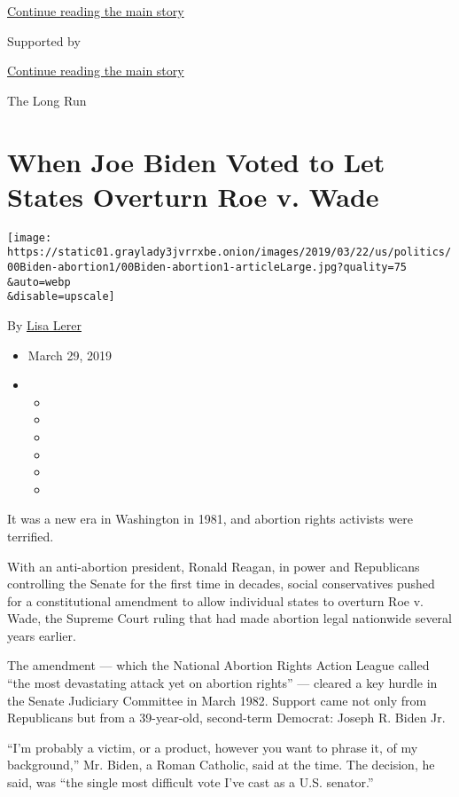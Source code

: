 \protect\hyperlink{after-top}{Continue reading the main story}

Supported by

\protect\hyperlink{after-sponsor}{Continue reading the main story}

The Long Run

\hypertarget{when-joe-biden-voted-to-let-states-overturn-roe-v-wade}{%
\section{When Joe Biden Voted to Let States Overturn Roe v.
Wade}\label{when-joe-biden-voted-to-let-states-overturn-roe-v-wade}}

\texttt{[image: https://static01.graylady3jvrrxbe.onion/images/2019/03/22/us/politics/00Biden-abortion1/00Biden-abortion1-articleLarge.jpg?quality=75\\\&auto=webp\\\&disable=upscale]}

By \href{https://www.nytimes3xbfgragh.onion/by/lisa-lerer}{Lisa Lerer}

\begin{itemize}
\item
  March 29, 2019
\item
  \begin{itemize}
  \item
  \item
  \item
  \item
  \item
  \item
  \end{itemize}
\end{itemize}

It was a new era in Washington in 1981, and abortion rights activists
were terrified.

With an anti-abortion president, Ronald Reagan, in power and Republicans
controlling the Senate for the first time in decades, social
conservatives pushed for a constitutional amendment to allow individual
states to overturn Roe v. Wade, the Supreme Court ruling that had made
abortion legal nationwide several years earlier.

The amendment --- which the National Abortion Rights Action League
called ``the most devastating attack yet on abortion rights'' ---
cleared a key hurdle in the Senate Judiciary Committee in March 1982.
Support came not only from Republicans but from a 39-year-old,
second-term Democrat: Joseph R. Biden Jr.

``I'm probably a victim, or a product, however you want to phrase it, of
my background,'' Mr. Biden, a Roman Catholic, said at the time. The
decision, he said, was ``the single most difficult vote I've cast as a
U.S. senator.''

